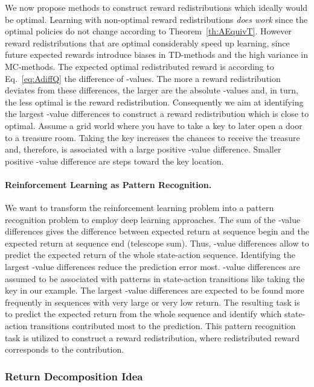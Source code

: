 \documentclass{article}
\begin{document}
\begin{appendices}
We now propose methods to construct reward redistributions which 
ideally would be optimal. 
Learning with non-optimal reward redistributions {\em does work} since the 
optimal policies do not change according to Theorem~\ref{th:AEquivT}.
However reward redistributions that are optimal considerably speed up learning,
since future expected rewards introduce 
biases in TD-methods and the high variance in MC-methods.
The expected optimal redistributed reward is according to Eq.~\eqref{eq:AdiffQ} 
the difference of -values. 
The more a reward redistribution deviates from these differences,
the larger are the absolute -values and, in turn, the less optimal
is the reward redistribution.
Consequently we aim at identifying the largest -value differences to
construct a reward redistribution which is close to optimal.
Assume a grid world where you have to take a key to later open a door
to a treasure room. Taking the key increases the chances to receive the
treasure and, therefore, is associated with a large positive -value difference.
Smaller positive -value difference are steps toward the key location.

\paragraph{Reinforcement Learning as Pattern Recognition.}
We want to transform the reinforcement learning problem into
a pattern recognition problem to employ deep learning approaches.
The sum of the -value differences gives the 
difference between expected return at sequence begin and
the expected return at sequence end (telescope sum).
Thus, -value differences allow to predict the 
expected return of the whole state-action sequence.
Identifying the largest -value differences 
reduce the prediction error most.
-value differences are assumed to be associated with
patterns in state-action transitions 
like taking the key in our example. 
The largest -value differences 
are expected to be found more frequently in sequences
with very large or very low return.
The resulting task is to predict the expected return
from the whole sequence and identify which 
state-action transitions contributed most to the prediction.
This pattern recognition task is utilized to
construct a reward redistribution, where redistributed reward
corresponds to the contribution.


\subsubsection{Return Decomposition Idea}


\end{appendices}
\end{document}
